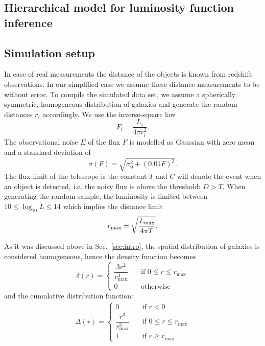 \subsection{Hierarchical model for luminosity function inference}
\label{sec:hm}



\subsection{Simulation setup}
\label{sec:simsetup}

In case of real measurements the distance of the objects is known from redshift observations.
In our simplified case we assume these distance measurements to be without error.
To compile the simulated data set, we assume a spherically symmetric, homogeneous distribution of galaxies and generate the random distances $r_i$ accordingly.
We use the inverse-square law
\begin{equation}
F_i = \frac{L_i}{4 \pi r_i^2}.
\end{equation}
The observational noise $E$ of the flux $F$ is modelled as Gaussian with zero mean and a standard deviation of
\begin{equation}
\sigma(F)=\sqrt{\sigma_{0}^2+(0.01F)^2}.
\label{eq:error}
\end{equation}
The flux limit of the telescope is the constant $T$ and $C$ will denote the event when an object is detected, i.e. the noisy flux is above the threshold: $D > T$.
When generating the random sample, the luminosity is limited between $10 \leq \log_{10}{L} \leq 14$ which implies the distance limit
\begin{equation}
r_\textnormal{max} = \sqrt{\frac{L_\textnormal{max}}{4 \pi T}}.
\end{equation}

As it was discussed above in Sec.~\ref{sec:intro}, the spatial distribution of galaxies is considered homogeneous, hence the density function becomes \begin{equation}\label{eq:dist_dens_func} \delta(r)= \begin{cases} \dfrac{3r^{2}}{r_{\max}^{3}} & \quad \text{if } 0\leq r\leq r_{\max}\\ 0 & \quad \text{otherwise} \end{cases} \end{equation} and the cumulative distribution function: \begin{align}\label{eq:dist_cum_func} \Delta(r)= \begin{cases} 0 & \quad \text{if } r<0\\ \dfrac{r^{3}}{r_{\max}^{3}} & \quad \text{if } 0\leq r\leq r_{\max}\\ 1 & \quad \text{if } r\geq r_{\max} \end{cases} \end{align}


